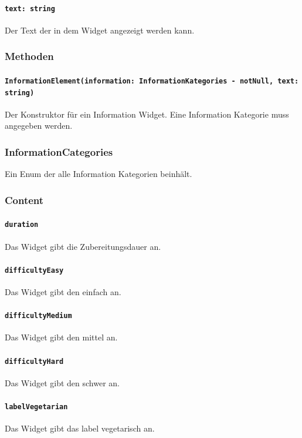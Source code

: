 \documentclass[parskip=full]{scrartcl}
\begin{document}
            \paragraph*{\texttt{text: string}} Der Text der in dem Widget angezeigt werden kann.

        \subsubsection*{Methoden}
            \paragraph*{\texttt{InformationElement(information: InformationKategories - notNull, text: string)}} Der Konstruktor für ein Information Widget. Eine Information Kategorie muss angegeben werden.

    
    \subsubsection{InformationCategories} \label{sec:InformationCategories}
        Ein Enum der alle Information Kategorien beinhält.
        \subsubsection*{Content}
            \paragraph*{\texttt{duration}} Das Widget gibt die Zubereitungsdauer an.
            \paragraph*{\texttt{difficultyEasy}} Das Widget gibt den  einfach an.
            \paragraph*{\texttt{difficultyMedium}} Das Widget gibt den  mittel an.
            \paragraph*{\texttt{difficultyHard}} Das Widget gibt den  schwer an.
            \paragraph*{\texttt{labelVegetarian}} Das Widget gibt das \gls{label} vegetarisch an.
\end{document}
